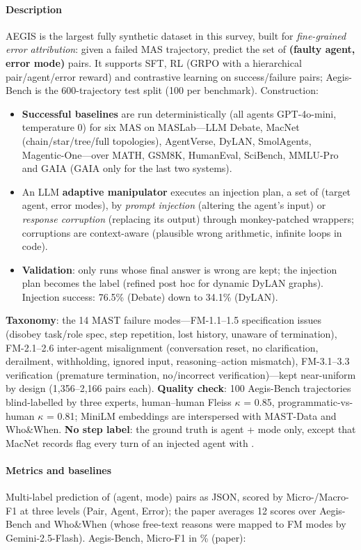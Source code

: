 \paragraph{Description} AEGIS is the largest fully synthetic dataset in this survey, built for \emph{fine-grained error attribution}: given a failed MAS trajectory, predict the set of \textbf{(faulty agent, error mode)} pairs. It supports SFT, RL (GRPO with a hierarchical pair/agent/error reward) and contrastive learning on success/failure pairs; Aegis-Bench is the 600-trajectory test split (100 per benchmark). Construction:
\begin{itemize}
\item \textbf{Successful baselines} are run deterministically (all agents GPT-4o-mini, temperature 0) for six MAS on MASLab---LLM Debate, MacNet (chain/star/tree/full topologies), AgentVerse, DyLAN, SmolAgents, Magentic-One---over MATH, GSM8K, HumanEval, SciBench, MMLU-Pro and GAIA (GAIA only for the last two systems).
\item An LLM \textbf{adaptive manipulator} executes an injection plan, a set of (target agent, error modes), by \emph{prompt injection} (altering the agent's input) or \emph{response corruption} (replacing its output) through monkey-patched wrappers; corruptions are context-aware (plausible wrong arithmetic, infinite loops in code).
\item \textbf{Validation}: only runs whose final answer is wrong are kept; the injection plan becomes the label (refined post hoc for dynamic DyLAN graphs). Injection success: 76.5\% (Debate) down to 34.1\% (DyLAN).
\end{itemize}
\textbf{Taxonomy}: the 14 MAST failure modes---FM-1.1--1.5 specification issues (disobey task/role spec, step repetition, lost history, unaware of termination), FM-2.1--2.6 inter-agent misalignment (conversation reset, no clarification, derailment, withholding, ignored input, reasoning--action mismatch), FM-3.1--3.3 verification (premature termination, no/incorrect verification)---kept near-uniform by design (1,356--2,166 pairs each). \textbf{Quality check}: 100 Aegis-Bench trajectories blind-labelled by three experts, human--human Fleiss $\kappa$ = 0.85, programmatic-vs-human $\kappa$ = 0.81; MiniLM embeddings are interspersed with MAST-Data and Who\&When. \textbf{No step label}: the ground truth is agent + mode only, except that MacNet records flag every turn of an injected agent with .

\paragraph{Metrics and baselines} Multi-label prediction of (agent, mode) pairs as JSON, scored by Micro-/Macro-F1 at three levels (Pair, Agent, Error); the paper averages 12 scores over Aegis-Bench and Who\&When (whose free-text reasons were mapped to FM modes by Gemini-2.5-Flash). Aegis-Bench, Micro-F1 in \% (paper):

